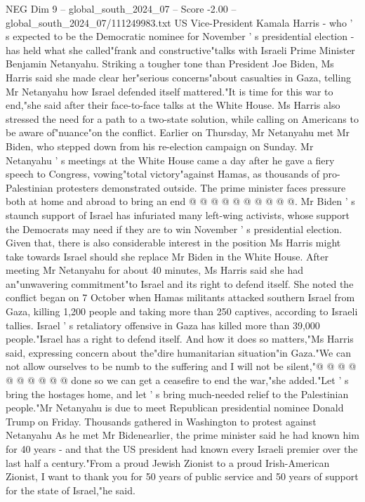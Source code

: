 \begin{textsample}{NEG Dim 9 – global\_south\_2024\_07 – Score -2.00 – global\_south\_2024\_07/111249983.txt}  \label{ex:f9_neg_350}
US Vice-President Kamala Harris - who ' s expected to be the Democratic nominee for November ' s presidential election - has held what she called"frank and constructive"talks with Israeli Prime Minister Benjamin Netanyahu.
Striking a tougher tone than President Joe Biden, Ms Harris said she made clear her"serious concerns"about casualties in Gaza, telling Mr Netanyahu how Israel defended itself mattered."It is time for this war to end,"she said after their face-to-face talks at the White House.
Ms Harris also stressed the need for a path to a two-state solution, while calling on Americans to be aware of"nuance"on the conflict.
Earlier on Thursday, Mr Netanyahu met Mr Biden, who stepped down from his re-election campaign on Sunday.
Mr Netanyahu ' s meetings at the White House came a day after he gave a fiery speech to Congress, vowing"total victory"against Hamas, as thousands of pro-Palestinian protesters demonstrated outside.
The prime minister faces pressure both at home and abroad to bring an end @ @ @ @ @ @ @ @ @ @.
Mr Biden ' s staunch support of Israel has infuriated many left-wing activists, whose support the Democrats may need if they are to win November ' s presidential election.
Given that, there is also considerable interest in the position Ms Harris might take towards Israel should she replace Mr Biden in the White House.
After meeting Mr Netanyahu for about 40 minutes, Ms Harris said she had an"unwavering commitment"to Israel and its right to defend itself.
She noted the conflict began on 7 October when Hamas militants attacked southern Israel from Gaza, killing 1,200 people and taking more than 250 captives, according to Israeli tallies.
Israel ' s retaliatory offensive in Gaza has killed more than 39,000 people."Israel has a right to defend itself.
And how it does so matters,"Ms Harris said, expressing concern about the"dire humanitarian situation"in Gaza."We can not allow ourselves to be numb to the suffering and I will not be silent,"@ @ @ @ @ @ @ @ @ @ done so we can get a ceasefire to end the war,"she added."Let ' s bring the hostages home, and let ' s bring much-needed relief to the Palestinian people."Mr Netanyahu is due to meet Republican presidential nominee Donald Trump on Friday.
Thousands gathered in Washington to protest against Netanyahu As he met Mr Bidenearlier, the prime minister said he had known him for 40 years - and that the US president had known every Israeli premier over the last half a century."From a proud Jewish Zionist to a proud Irish-American Zionist, I want to thank you for 50 years of public service and 50 years of support for the state of Israel,"he said.

\end{textsample}
